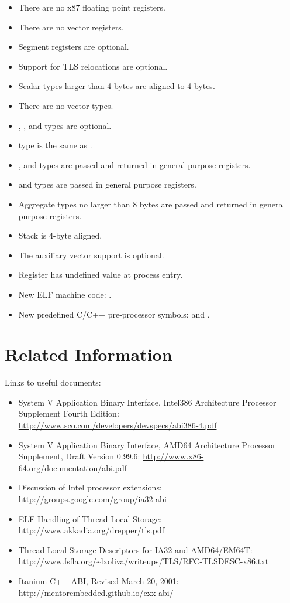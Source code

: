 \begin{itemize}
  \item There are no x87 floating point registers.
  \item There are no vector registers.
  \item Segment registers are optional.
  \item Support for TLS relocations are optional.
  \item Scalar types larger than 4 bytes are aligned to 4 bytes.
  \item There are no vector types.
  \item {}, , and 
	types are optional.
  \item {} type is the same as .
  \item {},  and  types are
	passed and returned in general purpose registers.
  \item {} and  types are passed
	in general purpose registers.
  \item Aggregate types no larger than 8 bytes are passed and returned
	in general purpose registers.
  \item Stack is 4-byte aligned.
  \item The auxiliary vector support is optional.
  \item Register \EDX has undefined value at process entry.
  \item New ELF machine code: .
  \item New predefined C/C++ pre-processor symbols:  and
	.
\end{itemize}


\section{Related Information}

Links to useful documents:
\begin{itemize}
 \item System V Application Binary Interface, Intel386{\texttrademark} Architecture
       Processor Supplement Fourth Edition:
       \url{http://www.sco.com/developers/devspecs/abi386-4.pdf}
 \item System V Application Binary Interface, AMD64 Architecture Processor
       Supplement, Draft Version 0.99.6:
       \url{http://www.x86-64.org/documentation/abi.pdf}
 \item Discussion of Intel processor extensions:
       \url{http://groups.google.com/group/ia32-abi}
 \item ELF Handling of Thread-Local Storage:
       \url{http://www.akkadia.org/drepper/tls.pdf}
 \item Thread-Local Storage Descriptors for IA32 and AMD64/EM64T:
       \url{http://www.fsfla.org/~lxoliva/writeups/TLS/RFC-TLSDESC-x86.txt}
 \item Itanium C++ ABI, Revised March 20, 2001:
       \url{http://mentorembedded.github.io/cxx-abi/}
\end{itemize}

